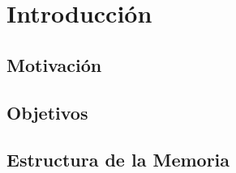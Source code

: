 \chapter{Introducción}
    \section{Motivación}
        \lipsum[0-5]
        
    \section{Objetivos}
        \lipsum[0-3]

    \section{Estructura de la Memoria}
        \lipsum[0-3]
